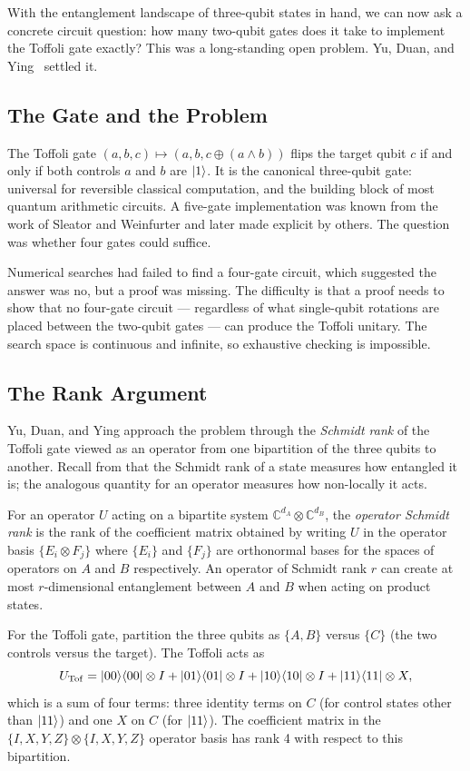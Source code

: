 \documentclass[12pt, a4paper, oneside]{report}
\theoremstyle{plain}
\theoremstyle{definition}
\theoremstyle{remark}
\newcommand{\CC}{\mathbb{C}}
\begin{document}
With the entanglement landscape of three-qubit states in hand, we can now ask a concrete
circuit question: how many two-qubit gates does it take to implement the Toffoli gate
exactly? This was a long-standing open problem. Yu, Duan, and Ying~\cite{yu2013} settled it.

\subsection{The Gate and the Problem}

The Toffoli gate $(a, b, c) \mapsto (a, b, c \oplus (a \wedge b))$ flips the target qubit
$c$ if and only if both controls $a$ and $b$ are $\ket{1}$. It is the canonical three-qubit
gate: universal for reversible classical computation, and the building block of most quantum
arithmetic circuits. A five-gate implementation was known from the work of Sleator and
Weinfurter and later made explicit by others. The question was whether four gates could
suffice.

Numerical searches had failed to find a four-gate circuit, which suggested the answer was
no, but a proof was missing. The difficulty is that a proof needs to show that no four-gate
circuit --- regardless of what single-qubit rotations are placed between the two-qubit gates
--- can produce the Toffoli unitary. The search space is continuous and infinite, so
exhaustive checking is impossible.

\subsection{The Rank Argument}

Yu, Duan, and Ying approach the problem through the \emph{Schmidt rank} of the Toffoli
gate viewed as an operator from one bipartition of the three qubits to another. Recall from
 that the Schmidt rank of a state measures how entangled it is; the
analogous quantity for an operator measures how non-locally it acts.

For an operator $U$ acting on a bipartite system $\CC^{d_A} \otimes \CC^{d_B}$, the
\emph{operator Schmidt rank} is the rank of the coefficient matrix obtained by writing $U$
in the operator basis $\{E_i \otimes F_j\}$ where $\{E_i\}$ and $\{F_j\}$ are orthonormal
bases for the spaces of operators on $A$ and $B$ respectively. An operator of Schmidt rank
$r$ can create at most $r$-dimensional entanglement between $A$ and $B$ when acting on
product states.

For the Toffoli gate, partition the three qubits as $\{A, B\}$ versus $\{C\}$ (the two
controls versus the target). The Toffoli acts as
\[
	U_{\mathrm{Tof}} = \ket{00}\!\bra{00} \otimes I
	+ \ket{01}\!\bra{01} \otimes I
	+ \ket{10}\!\bra{10} \otimes I
	+ \ket{11}\!\bra{11} \otimes X,
\]
which is a sum of four terms: three identity terms on $C$ (for control states other than
$\ket{11}$) and one $X$ on $C$ (for $\ket{11}$). The coefficient matrix in the $\{I, X, Y, Z\}
	\otimes \{I, X, Y, Z\}$ operator basis has rank 4 with respect to this bipartition.
\end{document}
